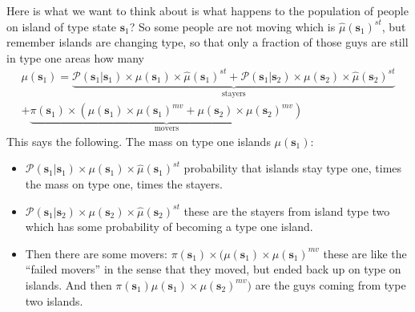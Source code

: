 \documentclass[pdftex,12pt]{article}
\begin{document}
\begin{itemize}
    Here is what we want to think about is what happens to the population of people on island of type state $\textbf{s}_1$? So some people are not moving which is $\hat \mu(\textbf{s}_1)^{st}$, but remember islands are changing type, so that only a fraction of those guys are still in type one areas how many
    \begin{align}
    \mu(\textbf{s}_1) = \underbrace{\mathcal{P}(\textbf{s}_{1} | \textbf{s}_{1}) \times \mu(\textbf{s}_1) \times \hat \mu(\textbf{s}_1)^{st} + \mathcal{P}(\textbf{s}_1 | \textbf{s}_{2})\times \mu(\textbf{s}_2) \times \hat \mu(\textbf{s}_2)^{st}}_{\mbox{stayers}}
    \nonumber \\
    \nonumber + \underbrace{\pi(\textbf{s}_1)\times (\mu(\textbf{s}_1) \times \mu(\textbf{s}_1)^{mv} + \mu(\textbf{s}_2)\times \mu(\textbf{s}_2)^{mv})}_{\mbox{movers}}
    \end{align}
    This says the following. The mass on type one islands $\mu(\textbf{s}_1)$:
    \begin{itemize}
    \item $\mathcal{P}(\textbf{s}_{1} | \textbf{s}_{1}) \times \mu(\textbf{s}_1) \times \hat \mu(\textbf{s}_1)^{st}$ probability that islands stay type one, times the mass on type one, times the stayers. 
    \item $\mathcal{P}(\textbf{s}_1 | \textbf{s}_{2})\times \mu(\textbf{s}_2) \times \hat \mu(\textbf{s}_2)^{st}$ these are the stayers from island type two which has some probability of becoming a type one island.
    \item Then there are some movers: $\pi(\textbf{s}_1)\times (\mu(\textbf{s}_1) \times \mu(\textbf{s}_1)^{mv}$ these are like the ``failed movers'' in the sense that they moved, but ended back up on type on islands. And then $\pi(\textbf{s}_1) \mu(\textbf{s}_1)\times \mu(\textbf{s}_2)^{mv})$ are the guys coming from type two islands.    
    \end{itemize}
    

\end{itemize}
\end{document}
